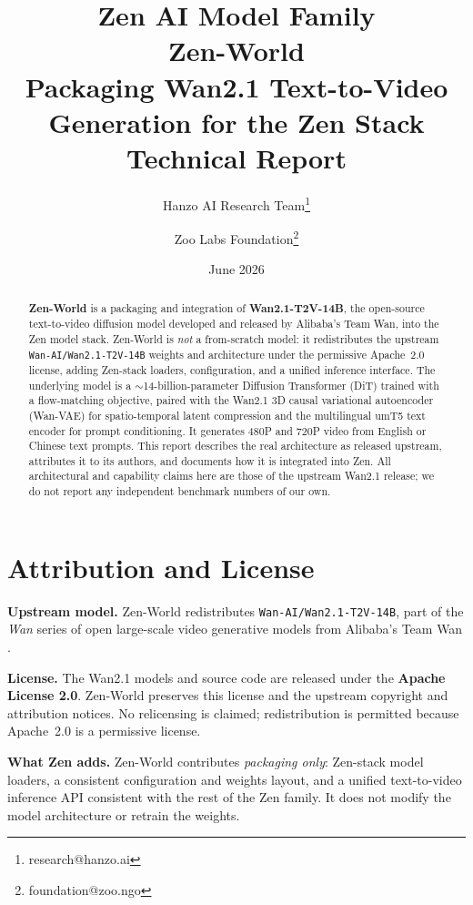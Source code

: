 \documentclass[11pt,a4paper]{article}
\title{
    \vspace{-2cm}
    \Large \textbf{Zen AI Model Family} \\
    \vspace{0.5cm}
    \Huge \textbf{Zen-World} \\
    \vspace{0.3cm}
    \large Packaging Wan2.1 Text-to-Video Generation for the Zen Stack \\
    \vspace{0.5cm}
    \normalsize Technical Report
}
\author{
    Hanzo AI Research Team\thanks{research@hanzo.ai} \and
    Zoo Labs Foundation\thanks{foundation@zoo.ngo}
}
\date{June 2026}
\begin{document}
\maketitle

\begin{abstract}
\textbf{Zen-World} is a packaging and integration of \textbf{Wan2.1-T2V-14B}, the open-source
text-to-video diffusion model developed and released by Alibaba's Team Wan, into the Zen model
stack. Zen-World is \emph{not} a from-scratch model: it redistributes the upstream
\texttt{Wan-AI/Wan2.1-T2V-14B} weights and architecture under the permissive Apache~2.0 license,
adding Zen-stack loaders, configuration, and a unified inference interface. The underlying model is
a $\sim$14-billion-parameter Diffusion Transformer (DiT) trained with a flow-matching objective,
paired with the Wan2.1 3D causal variational autoencoder (Wan-VAE) for spatio-temporal latent
compression and the multilingual umT5 text encoder for prompt conditioning. It generates 480P and
720P video from English or Chinese text prompts. This report describes the real architecture as
released upstream, attributes it to its authors, and documents how it is integrated into Zen. All
architectural and capability claims here are those of the upstream Wan2.1 release; we do not report
any independent benchmark numbers of our own.
\end{abstract}

\section*{Attribution and License}

\textbf{Upstream model.} Zen-World redistributes \texttt{Wan-AI/Wan2.1-T2V-14B}, part of the
\emph{Wan} series of open large-scale video generative models from Alibaba's Team Wan
\cite{wan2025report}.

\textbf{License.} The Wan2.1 models and source code are released under the
\textbf{Apache License 2.0}. Zen-World preserves this license and the upstream copyright and
attribution notices. No relicensing is claimed; redistribution is permitted because Apache~2.0 is a
permissive license.

\textbf{What Zen adds.} Zen-World contributes \emph{packaging only}: Zen-stack model loaders, a
consistent configuration and weights layout, and a unified text-to-video inference API consistent
with the rest of the Zen family. It does not modify the model architecture or retrain the weights.
\end{document}
